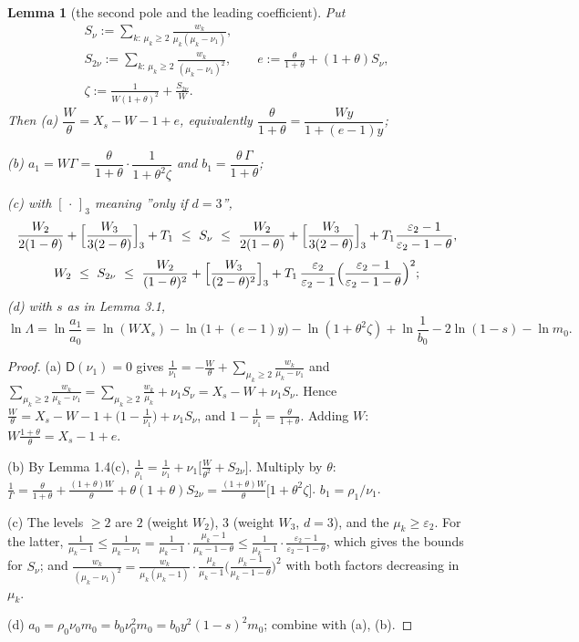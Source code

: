 \documentclass[11pt,a4paper]{article}
\newtheorem{lemma}[theorem]{Lemma}
\theoremstyle{definition}
\theoremstyle{remark}
\begin{document}
\begin{lemma}[{the second pole and the leading coefficient}]
Put
\begin{gather*}
S_\nu:=\sum_{k:\,\mu_k\ge2}\frac{w_k}{\mu_k(\mu_k-\nu_1)}, \\
S_{2\nu}:=\sum_{k:\,\mu_k\ge2}\frac{w_k}{(\mu_k-\nu_1)^2}, \qquad e:=\frac{\theta}{1+\theta}+(1+\theta)S_\nu, \\
\zeta:=\frac{1}{W(1+\theta)^2}+\frac{S_{2\nu}}{W}.
\end{gather*}
Then (a) $\dfrac W\theta=X_s-W-1+e$, equivalently $\dfrac{\theta}{1+\theta}=\dfrac{Wy}{1+(e-1)y}$;

(b) $a_1=W\Gamma=\dfrac{\theta}{1+\theta}\cdot\dfrac{1}{1+\theta^2\zeta}$ and $b_1=\dfrac{\theta\,\Gamma}{1+\theta}$;

(c) with $[\,\cdot\,]_{3}$ meaning ''only if $d=3$'',
\begin{equation*}
\frac{W_2}{2(1-\theta)}+\Bigl[\frac{W_3}{3(2-\theta)}\Bigr]_3+T_1\ \le\ S_\nu\ \le\ \frac{W_2}{2(1-\theta)}+\Bigl[\frac{W_3}{3(2-\theta)}\Bigr]_3+T_1\frac{\varepsilon_2-1}{\varepsilon_2-1-\theta},
\end{equation*}
\begin{equation*}
W_2\ \le\ S_{2\nu}\ \le\ \frac{W_2}{(1-\theta)^2}+\Bigl[\frac{W_3}{(2-\theta)^2}\Bigr]_3+T_1\,\frac{\varepsilon_2}{\varepsilon_2-1}\Bigl(\frac{\varepsilon_2-1}{\varepsilon_2-1-\theta}\Bigr)^2 ;
\end{equation*}
(d) with $s$ as in Lemma 3.1,
\begin{equation*}
\ln\Lambda=\ln\frac{a_1}{a_0}=\ln(WX_s)-\ln\bigl(1+(e-1)y\bigr)-\ln(1+\theta^2\zeta)+\ln\frac1{b_0}-2\ln(1-s)-\ln m_0 .
\end{equation*}
\end{lemma}

\begin{proof}
(a) $\mathsf D(\nu_1)=0$ gives $\frac1{\nu_1}=-\frac W\theta+\sum_{\mu_k\ge2}\frac{w_k}{\mu_k-\nu_1}$ and $\sum_{\mu_k\ge2}\frac{w_k}{\mu_k-\nu_1}=\sum_{\mu_k\ge2}\frac{w_k}{\mu_k}+\nu_1S_\nu=X_s-W+\nu_1S_\nu$. Hence $\frac W\theta=X_s-W-1+\bigl(1-\frac1{\nu_1}\bigr)+\nu_1S_\nu$, and $1-\frac1{\nu_1}=\frac\theta{1+\theta}$. Adding $W$: $W\frac{1+\theta}{\theta}=X_s-1+e$.

(b) By Lemma 1.4(c), $\frac1{\rho_1}=\frac1{\nu_1}+\nu_1\bigl[\frac W{\theta^2}+S_{2\nu}\bigr]$. Multiply by $\theta$: $\frac1\Gamma=\frac{\theta}{1+\theta}+\frac{(1+\theta)W}{\theta}+\theta(1+\theta)S_{2\nu}=\frac{(1+\theta)W}{\theta}\bigl[1+\theta^2\zeta\bigr]$. $b_1=\rho_1/\nu_1$.

(c) The levels $\ge2$ are $2$ (weight $W_2$), $3$ (weight $W_3$, $d=3$), and the $\mu_k\ge\varepsilon_2$. For the latter, $\frac{1}{\mu_k-1}\le\frac1{\mu_k-\nu_1}=\frac{1}{\mu_k-1}\cdot\frac{\mu_k-1}{\mu_k-1-\theta}\le\frac1{\mu_k-1}\cdot\frac{\varepsilon_2-1}{\varepsilon_2-1-\theta}$, which gives the bounds for $S_\nu$; and $\frac{w_k}{(\mu_k-\nu_1)^2}=\frac{w_k}{\mu_k(\mu_k-1)}\cdot\frac{\mu_k}{\mu_k-1}\bigl(\frac{\mu_k-1}{\mu_k-1-\theta}\bigr)^2$ with both factors decreasing in $\mu_k$.

(d) $a_0=\rho_0\nu_0m_0=b_0\nu_0^2m_0=b_0y^2(1-s)^2m_0$; combine with (a), (b).
\end{proof}
\end{document}
